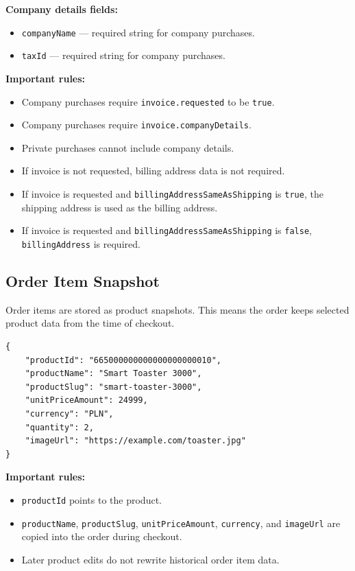 \textbf{Company details fields:}

\begin{itemize}
    \item \texttt{companyName} --- required string for company purchases.
    \item \texttt{taxId} --- required string for company purchases.
\end{itemize}

\textbf{Important rules:}

\begin{itemize}
    \item Company purchases require \texttt{invoice.requested} to be \texttt{true}.
    \item Company purchases require \texttt{invoice.companyDetails}.
    \item Private purchases cannot include company details.
    \item If invoice is not requested, billing address data is not required.
    \item If invoice is requested and \texttt{billingAddressSameAsShipping} is \texttt{true}, the shipping address is used as the billing address.
    \item If invoice is requested and \texttt{billingAddressSameAsShipping} is \texttt{false}, \texttt{billingAddress} is required.
\end{itemize}

\subsection{Order Item Snapshot}

Order items are stored as product snapshots. This means the order keeps selected product data from the time of checkout.

\begin{verbatim}
{
    "productId": "665000000000000000000010",
    "productName": "Smart Toaster 3000",
    "productSlug": "smart-toaster-3000",
    "unitPriceAmount": 24999,
    "currency": "PLN",
    "quantity": 2,
    "imageUrl": "https://example.com/toaster.jpg"
}
\end{verbatim}

\textbf{Important rules:}

\begin{itemize}
    \item \texttt{productId} points to the product.
    \item \texttt{productName}, \texttt{productSlug}, \texttt{unitPriceAmount}, \texttt{currency}, and \texttt{imageUrl} are copied into the order during checkout.
    \item Later product edits do not rewrite historical order item data.
\end{itemize}

